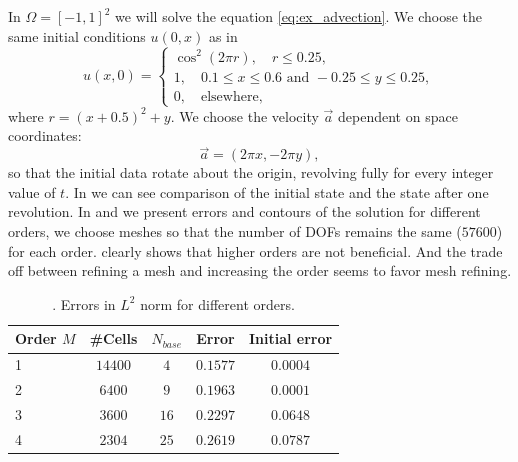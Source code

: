 \begin{example}[Advection 2D]
    \label{ex:adv2D_kriv}
    In $\Omega = [-1, 1]^2$ we will solve the equation \eqref{eq:ex_advection}.
    We choose the same initial conditions $u(0, x)$ as in \cite{Krivodonova2007}
    \begin{equation}
        u(x, 0) =\begin{cases}
        \cos^2(2\pi r), \quad r \leq 0.25,\\
        1, \quad 0.1 \leq x \leq 0.6 \mbox{ and } -0.25 \leq y \leq 0.25,\\
        0, \quad \mathrm{elsewhere},
        \end{cases}
    \end{equation}
    where $r = (x + 0.5)^2 + y$. We choose the velocity $\vec{a}$ dependent on space
    coordinates:
    $$
    \vec{a} = (2\pi x, -2\pi y),
    $$
    so that the initial data rotate about the origin, revolving fully for every integer
    value of $t$. In  we can see comparison of the initial state and
    the state after one revolution. In  and  we
    present errors and contours of the solution for different orders, we choose meshes so
    that the number of DOFs remains the same ($57600$) for each order.
     clearly shows that higher orders are not beneficial. And the
    trade off between refining a mesh and increasing the order seems to favor mesh
    refining.
    \begin{table}[p!]
        \centering
        \caption{. Errors in $L^2$ norm for different orders.}
        \label{tab:errs_adv2D}
        \begin{tabular}{lcccc}
            \toprule
            Order $M$ & \#Cells & $N_{base}$ & Error & Initial error \\
            \midrule
            1&$14400$&$ 4$&$0.1577$&$0.0004$\\
            2&$6400 $&$ 9$&$0.1963$&$0.0001$\\
            3&$3600 $&$16$&$0.2297$&$0.0648$\\
            4&$2304 $&$25$&$0.2619$&$0.0787$\\
            \bottomrule
        \end{tabular}
    \end{table}
\end{example}

